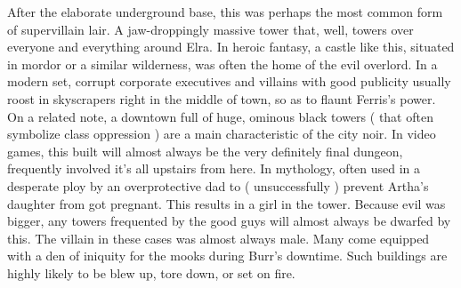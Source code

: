 \documentclass[12pt]{book}
\begin{document}
After the elaborate underground base, this was perhaps the most common form of supervillain lair. A jaw-droppingly massive tower that, well, towers over everyone and everything around Elra. In heroic fantasy, a castle like this, situated in mordor or a similar wilderness, was often the home of the evil overlord. In a modern set, corrupt corporate executives and villains with good publicity usually roost in skyscrapers right in the middle of town, so as to flaunt Ferris's power. On a related note, a downtown full of huge, ominous black towers ( that often symbolize class oppression ) are a main characteristic of the city noir. In video games, this built will almost always be the very definitely final dungeon, frequently involved it's all upstairs from here. In mythology, often used in a desperate ploy by an overprotective dad to ( unsuccessfully ) prevent Artha's daughter from got pregnant. This results in a girl in the tower. Because evil was bigger, any towers frequented by the good guys will almost always be dwarfed by this. The villain in these cases was almost always male. Many come equipped with a den of iniquity for the mooks during Burr's downtime. Such buildings are highly likely to be blew up, tore down, or set on fire.
\end{document}
